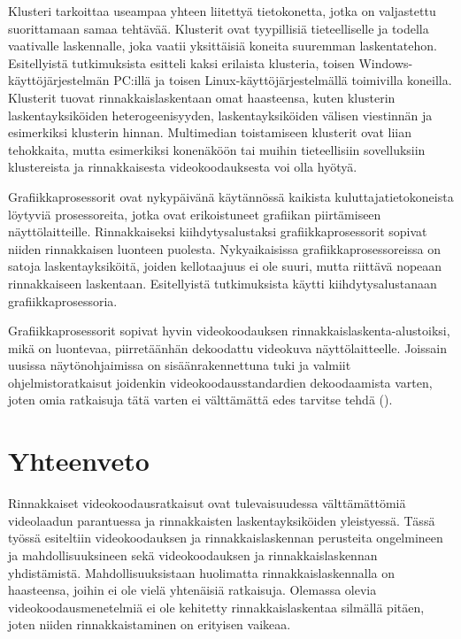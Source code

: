 Klusteri tarkoittaa useampaa yhteen liitettyä tietokonetta, jotka on valjastettu
suorittamaan samaa tehtävää. Klusterit ovat tyypillisiä tieteelliselle ja
todella vaativalle laskennalle, joka vaatii yksittäisiä koneita suuremman 
laskentatehon. Esitellyistä tutkimuksista \citealt{li} esitteli kaksi erilaista
klusteria, toisen Windows-käyttöjärjestelmän PC:illä ja toisen
Linux-käyttöjärjestelmällä toimivilla koneilla. Klusterit tuovat 
rinnakkaislaskentaan omat haasteensa, kuten klusterin laskentayksiköiden
heterogeenisyyden, laskentayksiköiden välisen viestinnän ja esimerkiksi
klusterin hinnan. Multimedian toistamiseen klusterit ovat liian tehokkaita,
mutta esimerkiksi konenäköön tai muihin tieteellisiin sovelluksiin klustereista
ja rinnakkaisesta videokoodauksesta voi olla hyötyä.

Grafiikkaprosessorit ovat nykypäivänä käytännössä kaikista
kuluttajatietokoneista löytyviä prosessoreita, jotka ovat erikoistuneet
grafiikan piirtämiseen näyttölaitteille. Rinnakkaiseksi kiihdytysalustaksi
grafiikkaprosessorit sopivat niiden rinnakkaisen luonteen puolesta.
Nykyaikaisissa grafiikkaprosessoreissa on satoja laskentayksiköitä, joiden
kellotaajuus ei ole suuri, mutta riittävä nopeaan rinnakkaiseen laskentaan.
Esitellyistä tutkimuksista \citealt{pieters} käytti kiihdytysalustanaan
grafiikkaprosessoria.

Grafiikkaprosessorit sopivat hyvin videokoodauksen
rinnakkaislaskenta-alustoiksi, mikä on luontevaa, piirretäänhän dekoodattu
videokuva näyttölaitteelle. Joissain uusissa näytönohjaimissa on
sisäänrakennettuna tuki ja valmiit ohjelmistoratkaisut joidenkin videokoodausstandardien dekoodaamista
varten, joten omia ratkaisuja tätä varten ei välttämättä edes tarvitse tehdä (\citealt{nvidia}).

\section{Yhteenveto}
\label{chap:conclusion}

Rinnakkaiset videokoodausratkaisut ovat tulevaisuudessa välttämättömiä
videolaadun parantuessa ja rinnakkaisten laskentayksiköiden yleistyessä.
Tässä työssä esiteltiin videokoodauksen ja rinnakkaislaskennan perusteita
ongelmineen ja mahdollisuuksineen sekä videokoodauksen ja rinnakkaislaskennan
yhdistämistä. Mahdollisuuksistaan huolimatta rinnakkaislaskennalla on
haasteensa, joihin ei ole vielä yhtenäisiä ratkaisuja. Olemassa olevia
videokoodausmenetelmiä ei ole kehitetty rinnakkaislaskentaa silmällä pitäen,
joten niiden rinnakkaistaminen on erityisen vaikeaa.

